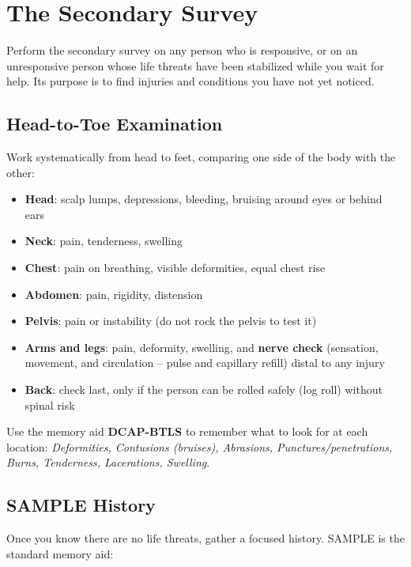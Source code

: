 \section{The Secondary Survey}

Perform the secondary survey on any person who is responsive, or on an unresponsive person whose life threats have been stabilized while you wait for help. Its purpose is to find injuries and conditions you have not yet noticed.

\subsection{Head-to-Toe Examination}

Work systematically from head to feet, comparing one side of the body with the other:

\begin{itemize}[leftmargin=*]
\item \textbf{Head}: scalp lumps, depressions, bleeding, bruising around eyes or behind ears
\item \textbf{Neck}: pain, tenderness, swelling
\item \textbf{Chest}: pain on breathing, visible deformities, equal chest rise
\item \textbf{Abdomen}: pain, rigidity, distension
\item \textbf{Pelvis}: pain or instability (do not rock the pelvis to test it)
\item \textbf{Arms and legs}: pain, deformity, swelling, and \textbf{nerve check} (sensation, movement, and circulation -- pulse and capillary refill) distal to any injury
\item \textbf{Back}: check last, only if the person can be rolled safely (log roll) without spinal risk
\end{itemize}

Use the memory aid \textbf{DCAP-BTLS} to remember what to look for at each location: \emph{Deformities, Contusions (bruises), Abrasions, Punctures/penetrations, Burns, Tenderness, Lacerations, Swelling}.

\subsection{SAMPLE History}

Once you know there are no life threats, gather a focused history. SAMPLE is the standard memory aid:

